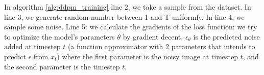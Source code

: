 In algorithm \ref{alg:ddpm_training} line 2, we take a sample from the dataset. In line 3, we generate random number between 1 and T uniformly. In line 4, we sample some noise. Line 5: we calculate the gradients of the loss function: we try to optimize the model's parameters $\theta$ by gradient decent. $\epsilon_\theta$ is the predicted noise added at timestep $t$ (a function approximator with 2 parameters that intends to predict $\epsilon$ from $x_t$) where the first parameter is the noisy image at timestep $t$, and the second parameter is the timestep $t$.



